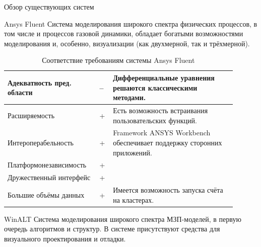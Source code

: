 \documentclass[a4paper,12pt]{extarticle}
\begin{document}
\begin{section}{Обзор существующих систем}
\begin{subsection}{Ansys Fluent}
    Система моделирования широкого спектра физических процессов, в том числе и процессов газовой динамики, обладает богатыми возможностями моделирования и, особенно, визуализации (как двухмерной, так и трёхмерной).

    \begin{table}[h]
        \caption{Соответствие требованиям системы Ansys Fluent}
        \label{tabular:ansysfluent}
        \begin{center}
            \begin{tabular}{|p{0.35\linewidth}|p{0.05\linewidth}|p{0.5\linewidth}|} \hline
                Адекватность пред. области & -- & Дифференциальные уравнения решаются классическими методами. \\ \hline
                Расширяемость              & + & Есть возможность встраивания пользовательских функций. \\ \hline
                Интероперабельность        & + & Framework ANSYS Workbench обеспечивает поддержку сторонних приложений.\\ \hline
                Платформонезависимость     & + & \\ \hline
                Дружественный интерфейс    & + & \\ \hline
                Большие объёмы данных      & + & Имеется возможность запуска счёта на кластерах. \\ \hline
            \end{tabular}
        \end{center}
    \end{table}
\end{subsection}
\newpage

\begin{subsection}{WinALT}
    Система моделирования широкого спектра МЗП-моделей, в первую очередь алгоритмов и структур. В системе присутствуют средства для визуального проектирования и отладки.
    

\end{subsection}
\end{section}
\end{document}
